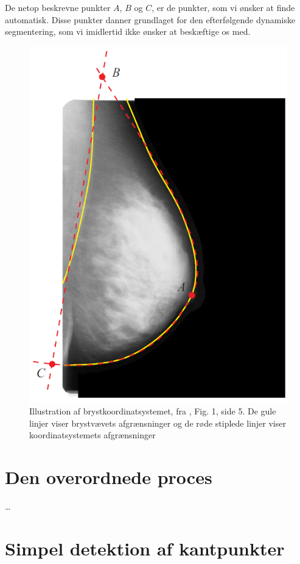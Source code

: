 \documentclass[11pt,a4paper]{article}
\begin{document}
De netop beskrevne punkter $A$, $B$ og $C$, er de punkter, som vi ønsker at finde automatisk. Disse punkter danner grundlaget for den efterfølgende dynamiske segmentering, som vi imidlertid ikke ønsker at beskæftige os med.

\begin{figure}
	\centering
		\includegraphics{grafik/brystkoordinatsystem.png}
	\caption{Illustration af brystkoordinatsystemet, fra \cite{brandtetal}, Fig. 1, side 5. De gule linjer viser brystvævets afgrænsninger og de røde stiplede linjer viser koordinatsystemets afgrænsninger}
	\label{fig:bks}
\end{figure}

\section{Den overordnede proces}
\ldots

\section{Simpel detektion af kantpunkter}
\end{document}
